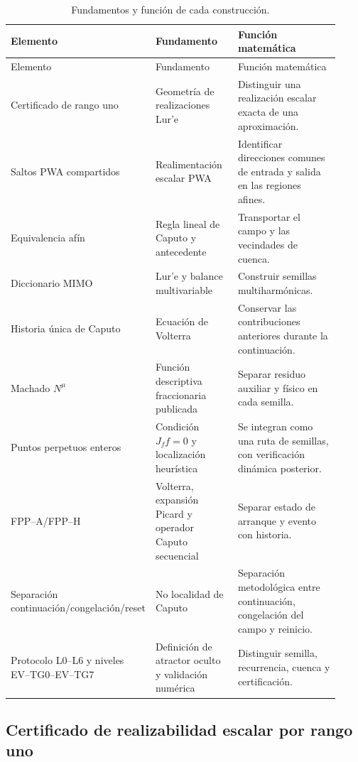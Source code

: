 \begin{longtable}{L{0.28\linewidth}L{0.27\linewidth}L{0.37\linewidth}}
\caption{Fundamentos y función de cada construcción.}
\label{tab:novelty-map}\\
\toprule
Elemento & Fundamento & Función matemática\\
\midrule
\endfirsthead
\toprule
Elemento & Fundamento & Función matemática\\
\midrule
\endhead
Certificado de rango uno & Geometría de realizaciones Lur'e & Distinguir una
realización escalar exacta de una aproximación.\\
Saltos PWA compartidos & Realimentación escalar PWA & Identificar direcciones
comunes de entrada y salida en las regiones afines.\\
Equivalencia afín & Regla lineal de Caputo y antecedente
\cite{sayed2020} & Transportar el campo y las vecindades de cuenca.\\
Diccionario MIMO & Lur'e y balance multivariable
\cite{bonani1999,rogov2019} & Construir semillas multiharmónicas.\\
Historia única de Caputo & Ecuación de Volterra & Conservar las contribuciones
anteriores durante la continuación.\\
Machado \(N^\mu\) & Función descriptiva fraccionaria publicada
\cite{Machado2015FDF} & Separar residuo auxiliar y físico en cada semilla.\\
Puntos perpetuos enteros & Condición \(J_f f=0\) y localización heurística
\cite{Prasad2015Perpetual,DudkowskiPrasadKapitaniak2017} & Se integran como
una ruta de semillas, con verificación dinámica posterior.\\
FPP--A/FPP--H & Volterra, expansión Picard y operador Caputo secuencial &
Separar estado de arranque y evento con historia.\\
Separación continuación/congelación/reset & No localidad de Caputo &
Separación metodológica entre continuación, congelación del campo y reinicio.\\
Protocolo L0--L6 y niveles EV--TG0--EV--TG7 & Definición de atractor oculto y
validación numérica & Distinguir semilla, recurrencia, cuenca y certificación.\\
\bottomrule
\end{longtable}

\subsection{Certificado de realizabilidad escalar por rango uno}
\label{sec:rank-one-certificate}

